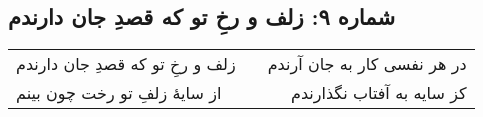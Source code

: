 \begin{center}
\section*{شماره ۹: زلف و رخِ تو که قصدِ جان دارندم}
\label{sec:009}
\begin{longtable}{l p{0.5cm} r}
زلف و رخِ تو که قصدِ جان دارندم
&&
در هر نفسی کار به جان آرندم
\\
از سایهٔ زلفِ تو رخت چون بینم
&&
کز سایه به آفتاب نگذارندم
\\
\end{longtable}
\end{center}

